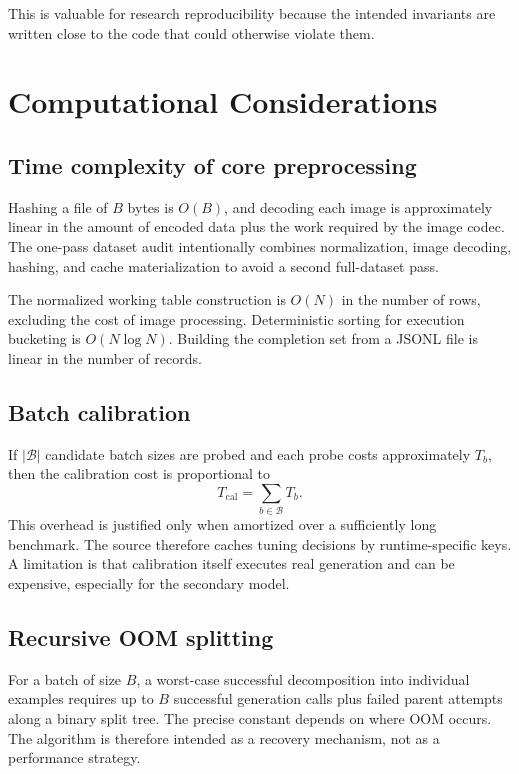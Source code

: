 \documentclass[11pt,a4paper]{article}
\begin{document}
This is valuable for research reproducibility because the intended invariants are written close to the code that could otherwise violate them.

\section{Computational Considerations}
\subsection{Time complexity of core preprocessing}
Hashing a file of \(B\) bytes is \(O(B)\), and decoding each image is approximately linear in the amount of encoded data plus the work required by the image codec. The one-pass dataset audit intentionally combines normalization, image decoding, hashing, and cache materialization to avoid a second full-dataset pass.

The normalized working table construction is \(O(N)\) in the number of rows, excluding the cost of image processing. Deterministic sorting for execution bucketing is \(O(N\log N)\). Building the completion set from a JSONL file is linear in the number of records.

\subsection{Batch calibration}
If \(|\mathcal{B}|\) candidate batch sizes are probed and each probe costs approximately \(T_b\), then the calibration cost is proportional to
\begin{equation}
T_{\mathrm{cal}} = \sum_{b\in\mathcal{B}} T_b.
\end{equation}
This overhead is justified only when amortized over a sufficiently long benchmark. The source therefore caches tuning decisions by runtime-specific keys. A limitation is that calibration itself executes real generation and can be expensive, especially for the secondary model.

\subsection{Recursive OOM splitting}
For a batch of size \(B\), a worst-case successful decomposition into individual examples requires up to \(B\) successful generation calls plus failed parent attempts along a binary split tree. The precise constant depends on where OOM occurs. The algorithm is therefore intended as a recovery mechanism, not as a performance strategy.
\end{document}
